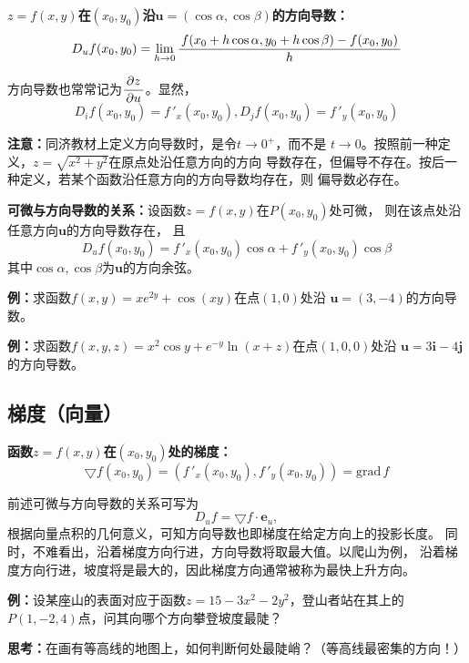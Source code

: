 \begin{thx}
	{\bf $z=f(x,y)$在$(x_0,y_0)$沿$\bm{u}=(\cos\alpha,\cos\beta)$的方向导数：}
	$${D_uf(x_0,y_0)=\lim\limits_{h\to 0}
	\displaystyle\frac{\,{f(x_0+h\cos\alpha,y_0+h\cos\beta)-f(x_0,y_0)}\,}{\,{h}\,}}$$
\end{thx}
方向导数也常常记为$\displaystyle\frac{\,{\partial z}\,}{\,{\partial u}\,}$。显然，
$$D_if(x_0,y_0)=f\,'_x(x_0,y_0),
D_jf(x_0,y_0)=f\,'_y(x_0,y_0)$$

{\color{red} {\bf 注意：}同济教材上定义方向导数时，是令$t\to0^+$，而不是
$t\to0$。按照前一种定义，$z=\sqrt{x^2+y^2}$在原点处沿任意方向的方向
导数存在，但偏导不存在。按后一种定义，若某个函数沿任意方向的方向导数均存在，则
偏导数必存在。}

\begin{thx}
	{\bf 可微与方向导数的关系：}设函数$z=f(x,y)$在$P(x_0,y_0)$处可微， 
	则在该点处沿任意方向$\bm{u}$的方向导数存在， 且
	$$D_uf(x_0,y_0) =f\,'_x(x_0,y_0)\cos\alpha+f\,'_y(x_0,y_0)\cos\beta$$
	其中$\cos\alpha,\cos\beta$为$\bm{u}$的方向余弦。
\end{thx}

{\bf 例：}求函数$f(x,y)=xe^{2y}+\cos(xy)$在点$(1,0)$处沿
$\bm{u}=(3,-4)$的方向导数。

{\bf 例：}求函数$f(x,y,z)=x^2\cos y+e^{-y}\ln(x+z)$在点$(1,0,0)$处沿
$\bm{u}=3\bm{i}-4\bm{j}$的方向导数。

\subsection{梯度（向量）}

\begin{thx}
	{\bf 函数$z=f(x,y)$在$(x_0,y_0)$处的梯度：}
	$$\bigtriangledown
	f(x_0,y_0)=(f\,'_x(x_0,y_0),f\,'_y(x_0,y_0))=\bm{\mathrm{grad}}\,f$$
\end{thx}
前述可微与方向导数的关系可写为
$$D_uf=\bigtriangledown f\cdot\bm{e}_u,$$
根据向量点积的几何意义，可知方向导数也即梯度在给定方向上的投影长度。
同时，不难看出，沿着梯度方向行进，方向导数将取最大值。以爬山为例，
沿着梯度方向行进，坡度将是最大的，因此梯度方向通常被称为{\kaishu 最快上升方向}。

{\bf 例：}设某座山的表面对应于函数$z=15-3x^2-2y^2$，登山者站在其上的
$P(1,-2,4)$点，问其向哪个方向攀登坡度最陡？

{\bf 思考：}在画有等高线的地图上，如何判断何处最陡峭？（等高线最密集的方向！）

